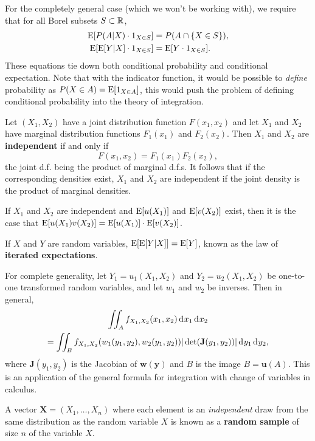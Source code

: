 \documentclass[10pt]{article}
\begin{document}
For the completely general case (which we won't be working with), we require
that for all Borel subsets $S\subset \mathbb{R}$,
\begin{align*}
  \operatorname{E}[P(A|X)\cdot 1_{X\in S}] &= P(A\cap \{X\in S\}),  \\
\operatorname{E}[\operatorname{E}[Y|X]\cdot 1_{X\in S}]      &= \operatorname{E}[Y\cdot 1_{X\in S}].
\end{align*}
These equations tie down both conditional probability and conditional
expectation. Note that with the indicator function, it would be possible to 
\emph{define} probability as $P(X\in A) = \operatorname{E}[1_{X\in A}]$, this would push the problem
of defining conditional probability into the theory of integration.




Let $(X_1,X_2)$ have a joint distribution function 
$F(x_1,x_2)$ and let $X_1$ and $X_2$ have marginal distribution functions $F_1(x_1)$
and $F_2(x_2)$. Then $X_1$ and $X_2$ are \textbf{independent} if and only if 
\[F(x_1,x_2)= F_1(x_1) F_2(x_2),\]
the joint d.f. being the product of marginal d.f.s. It follows that if the corresponding
densities exist, $X_1$ and $X_2$ are independent if the joint
density is the product of marginal densities.

If $X_1$ and $X_2$ are independent and $\operatorname{E}[u(X_1)]$ and $\operatorname{E}[v(X_2)]$ exist, then it 
is the case that $\operatorname{E}[u(X_1)v(X_2)] = \operatorname{E}[u(X_1)]\cdot \operatorname{E}[v(X_2)]$.

If $X$ and $Y$ are random variables, $\operatorname{E}\!\left[\operatorname{E}[Y|X]\right] = \operatorname{E}[Y]$, known as the law of
\textbf{iterated expectations}.


For complete generality, let $Y_1=u_1(X_1,X_2)$ and $Y_2=u_2(X_1,X_2)$ be
one-to-one transformed random variables, and let $w_1$ and $w_2$ be inverses.
Then in general, 
\begin{multline*} \int\!\!\!\int_A f_{X_1,X_2}(x_1,x_2)\rd x_1 \rd x_2 \\
= \int\!\!\!\int_B
f_{X_1,X_2} (w_1(y_1,y_2),w_2(y_1,y_2))| \det(\mathbf{J}(y_1,y_2))| \rd y_1
\rd y_2,\end{multline*} 
where $\mathbf{J}(y_1,y_2)$ is the Jacobian of $\mathbf{w}(\mathbf{y})$ and $B$ is
the image $B=\mathbf{u}(A)$. This is an application of the general formula
for integration with change of variables in calculus.


A vector $\mathbf{X}=(X_1,\dots,X_n)$ where each element is an
\emph{independent} draw from the same distribution as the random variable $X$ is
known as a \textbf{random sample} of size $n$ of the variable $X$.
\end{document}
